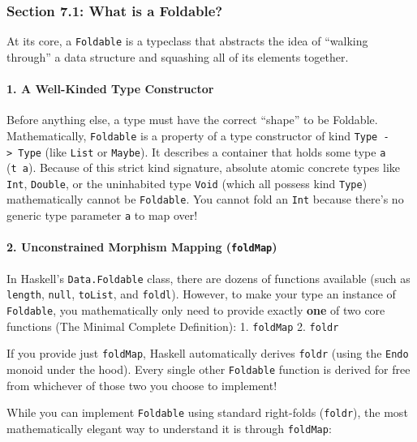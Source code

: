 \documentclass[
]{article}
\begin{document}
\subsubsection{Section 7.1: What is a
Foldable?}\label{section-7.1-what-is-a-foldable}

At its core, a \texttt{Foldable} is a typeclass that abstracts the idea
of ``walking through'' a data structure and squashing all of its
elements together.

\paragraph{1. A Well-Kinded Type
Constructor}\label{a-well-kinded-type-constructor}

Before anything else, a type must have the correct ``shape'' to be
Foldable. Mathematically, \texttt{Foldable} is a property of a type
constructor of kind \texttt{Type\ -\textgreater{}\ Type} (like
\texttt{List} or \texttt{Maybe}). It describes a container that holds
some type \texttt{a} (\texttt{t\ a}). Because of this strict kind
signature, absolute atomic concrete types like \texttt{Int},
\texttt{Double}, or the uninhabited type \texttt{Void} (which all
possess kind \texttt{Type}) mathematically cannot be \texttt{Foldable}.
You cannot fold an \texttt{Int} because there's no generic type
parameter \texttt{a} to map over!

\paragraph{\texorpdfstring{2. Unconstrained Morphism Mapping
(\texttt{foldMap})}{2. Unconstrained Morphism Mapping (foldMap)}}\label{unconstrained-morphism-mapping-foldmap}

In Haskell's \texttt{Data.Foldable} class, there are dozens of functions
available (such as \texttt{length}, \texttt{null}, \texttt{toList}, and
\texttt{foldl}). However, to make your type an instance of
\texttt{Foldable}, you mathematically only need to provide exactly
\textbf{one} of two core functions (The Minimal Complete Definition): 1.
\texttt{foldMap} 2. \texttt{foldr}

If you provide just \texttt{foldMap}, Haskell automatically derives
\texttt{foldr} (using the \texttt{Endo} monoid under the hood). Every
single other \texttt{Foldable} function is derived for free from
whichever of those two you choose to implement!

While you can implement \texttt{Foldable} using standard right-folds
(\texttt{foldr}), the most mathematically elegant way to understand it
is through \texttt{foldMap}:
\end{document}

